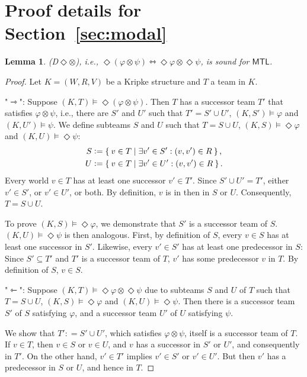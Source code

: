 \documentclass[a4paper,english,fleqn,11pt,final]{scrartcl}
\makeatletter
\newcommand{\ie}{i.e.\@\xspace}
\newcommand{\logic}[1]{\ensuremath{\mathsf{#1}}\xspace}
\newcommand{\MTL}{\logic{MTL}}
\providecommand{\dfn}{\mathrel{\mathop:}=}
\newcommand{\tequiv}{\leftrightarrowtriangle}
\newcommand{\tens}{\otimes}
\newcommand{\Deriv}[1]{{\normalfont\textsf{#1}}}
\theoremstyle{plain}
\newtheorem{lemma}[theorem]{Lemma}
\theoremstyle{definition}
\makeatother
\begin{document}
\section{Proof details for Section~\ref{sec:modal}}

\begin{lemma}\label{lem:diamond-sound}
\Deriv{(D$\Diamond\tens$)}, \ie, $\Diamond (\varphi \tens \psi) \tequiv \Diamond\varphi \tens \Diamond \psi$, is sound for $\MTL$.
\end{lemma}
\begin{proof}
Let $K = (W,R,V)$ be a Kripke structure and $T$ a team in $K$.

"$\rightarrowtriangle$":
Suppose $(K,T) \vDash \Diamond(\varphi \tens \psi)$.
Then $T$ has a successor team $T'$ that satisfies $\varphi\tens\psi$, \ie, there are $S'$ and $U'$ such that $T' = S'\cup U'$, $(K,S')\vDash \varphi$ and $(K,U')\vDash \psi$.
We define subteams $S$ and $U$ such that $T = S \cup U$, $(K,S)\vDash \Diamond\varphi$ and $(K,U)\vDash\Diamond\psi$:
\begin{align*}
S &\dfn \Set{ v \in T | \exists v' \in S' : (v,v') \in R }\text{,}\\
U &\dfn \Set{ v \in T | \exists v' \in U' : (v,v') \in R }\text{.}
\end{align*}
Every world $v \in T$ has at least one successor $v' \in T'$.
Since $S'\cup U' = T'$, either $v' \in S'$, or $v' \in U'$, or both.
By definition, $v$ is in then in $S$ or $U$.
Consequently, $T = S \cup U$.

To prove $(K, S)\vDash \Diamond \varphi$, we demonstrate that $S'$ is a successor team of $S$.
$(K,U) \vDash \Diamond \psi$ is then analogous.
First, by definition of $S$, every $v\in S$ has at least one successor in $S'$.
Likewise, every $v'\in S'$ has at least one predecessor in $S$:
Since $S' \subseteq T'$ and $T'$ is a successor team of $T$, $v'$ has some predecessor $v$ in $T$.
By definition of $S$, $v \in S$.

"$\leftarrowtriangle$":
Suppose $(K, T)\vDash \Diamond\varphi \tens \Diamond\psi$ due to subteams $S$ and $U$ of $T$ such that $T = S \cup U$, $(K,S)\vDash \Diamond\varphi$ and $(K,U)\vDash \Diamond\psi$.
Then there is a successor team $S'$ of $S$ satisfying $\varphi$, and a successor team $U'$ of $U$ satisfying $\psi$.

We show that $T' \dfn S' \cup U'$, which satisfies $\varphi \tens \psi$, itself is a successor team of $T$.
If $v \in T$, then $v \in S$ or $v \in U$, and $v$ has a successor in $S'$ or $U'$, and consequently in $T'$.
On the other hand, $v' \in T'$ implies $v' \in S'$ or $v' \in U'$.
But then $v'$ has a predecessor in $S$ or $U$, and hence in $T$.
\end{proof}
\end{document}
